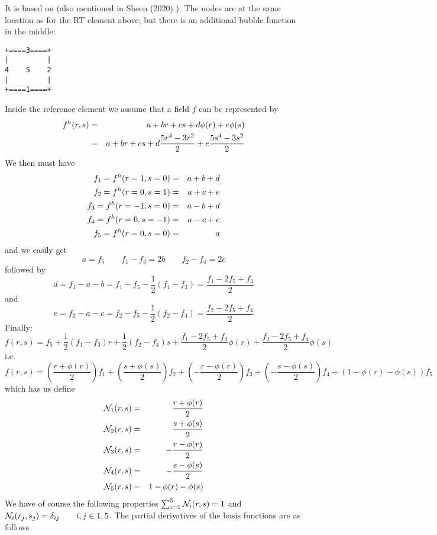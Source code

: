 

It is based on \textcite{han84} (also mentioned in Sheen (2020) \cite{shee20}).
The nodes are at the same location as for the RT element above, but 
there is an additional bubble function in the middle:
\begin{verbatim}
+====3====+
|         |
4    5    2
|         |
+====1====+
\end{verbatim}
Inside the reference element we assume that a field $f$
can be represented by 
\begin{eqnarray}
f^h(r,s) 
&=& a+ br +cs +d \phi(r) +e \phi(s) \nonumber\\
&=& a+ br +cs +d \frac{5r^4-3r^2}{2}+e \frac{5s^4-3s^2}{2} \nonumber
\end{eqnarray}
We then must have 
\begin{eqnarray}
f_1 = f^h(r=1,s=0) &=& a+ b +d \nonumber\\
f_2 = f^h(r=0,s=1) &=& a+ c +e \nonumber\\
f_3 = f^h(r=-1,s=0) &=& a- b +d \nonumber\\
f_4 = f^h(r=0,s=-1) &=& a -c +e \nonumber\\
f_5 = f^h(r=0,s=0) &=& a  \nonumber
\end{eqnarray}
and we easily get 
\[
a = f_5 
\qquad
f_1-f_3 = 2b
\qquad 
f_2-f_4 = 2c
\]
followed by
\[
d=f_1-a-b = f_1 - f_5 - \frac{1}{2}(f_1-f_3) = \frac{f_1-2f_5+f_3}{2}
\]
and 
\[
e = f_2-a-c = f_2 - f_5 -  \frac{1}{2}(f_2-f_4) = \frac{f_2 -2f_5+f_4 }{2}
\]
Finally:
\[
f(r,s) = 
f_5 +
\frac{1}{2}(f_1-f_3) r+
\frac{1}{2}(f_2-f_4) s+
\frac{f_1-2f_5+f_3}{2} \phi(r)+
\frac{f_2 -2f_5+f_4 }{2} \phi(s)
\]
i.e.
\[
f(r,s) = 
\left(\frac{r + \phi(r)}{2} \right)f_1 +
\left(\frac{s+\phi(s)}{2} \right)f_2 +
\left(-\frac{r-\phi(r)}{2} \right)f_3 +
\left(-\frac{s - \phi(s)}{2} \right)f_4 +
\left(1-\phi(r)-\phi(s) \right)f_5 
\]
which has us define 
\begin{eqnarray}
{\mathcal{N}}_1(r,s) &=& \frac{r + \phi(r)}{2} \nonumber\\
{\mathcal{N}}_2(r,s) &=& \frac{s+\phi(s)}{2} \nonumber\\
{\mathcal{N}}_3(r,s) &=& -\frac{r-\phi(r)}{2} \nonumber\\
{\mathcal{N}}_4(r,s) &=& -\frac{s - \phi(s)}{2}\nonumber\\
{\mathcal{N}}_5(r,s) &=& 1-\phi(r)-\phi(s)\nonumber
\end{eqnarray}
We have of course the following properties $\sum_{i=1}^5 {\mathcal{N}}_i(r,s) = 1$ and 
${\mathcal{N}}_i(r_j,s_j) = \delta_{ij}  \qquad i,j \in 1,5$. 
The partial derivatives of the basis functions are as follows
